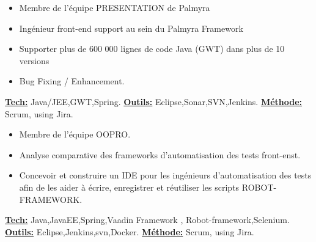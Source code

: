 \documentclass[10pt,a4paper]{altacv}
\begin{document}
\begin{itemize}
\item Membre de l'équipe PRESENTATION de Palmyra
\item Ingénieur front-end support au sein du Palmyra Framework
\item Supporter plus de 600 000 lignes de code Java (GWT) dans plus de 10 versions
\item Bug Fixing / Enhancement.
\end{itemize}
\underline{\textbf{Tech:}} Java/JEE,GWT,Spring.
\newline
\underline{\textbf{Outils:}} Eclipse,Sonar,SVN,Jenkins.
\newline
\underline{\textbf{Méthode:}} Scrum, using Jira.
\divider


\begin{itemize}
\item Membre de l'équipe OOPRO.

\item Analyse comparative des frameworks d'automatisation des tests front-enst. 
\item Concevoir et construire un IDE pour les ingénieurs d'automatisation des tests afin de les aider à écrire, enregistrer et réutiliser les scripts ROBOT-FRAMEWORK.
\end{itemize}
\underline{\textbf{Tech:}} Java,JavaEE,Spring,Vaadin Framework , Robot-framework,Selenium.
\newline
\underline{\textbf{Outils:}} Eclipse,Jenkins,svn,Docker. 
\newline
\underline{\textbf{Méthode:}} Scrum, using Jira.




\end{document}
